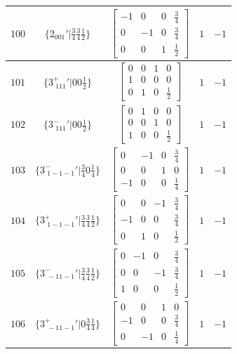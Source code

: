 \documentclass[fleqn,8pt]{jsarticle}
\begin{document}
\begin{longtable}{ccccc}
$ 100 $ & $ \{2{}_{001}{}'|\frac{3}{4} \frac{3}{4} \frac{1}{2}\} $ & $ \begin{bmatrix} -1 & 0 & 0 & \frac{3}{4} \\ 0 & -1 & 0 & \frac{3}{4} \\ 0 & 0 & 1 & \frac{1}{2} \end{bmatrix} $ & $ 1 $ & $ -1 $ \\ \hline
$ 101 $ & $ \{3^{+}_{\,\,111}{}'|0 0 \frac{1}{2}\} $ & $ \begin{bmatrix} 0 & 0 & 1 & 0 \\ 1 & 0 & 0 & 0 \\ 0 & 1 & 0 & \frac{1}{2} \end{bmatrix} $ & $ 1 $ & $ -1 $ \\ \hline
$ 102 $ & $ \{3^{-}_{\,\,111}{}'|0 0 \frac{1}{2}\} $ & $ \begin{bmatrix} 0 & 1 & 0 & 0 \\ 0 & 0 & 1 & 0 \\ 1 & 0 & 0 & \frac{1}{2} \end{bmatrix} $ & $ 1 $ & $ -1 $ \\ \hline
$ 103 $ & $ \{3^{-}_{\,\,1-1-1}{}'|\frac{3}{4} 0 \frac{1}{4}\} $ & $ \begin{bmatrix} 0 & -1 & 0 & \frac{3}{4} \\ 0 & 0 & 1 & 0 \\ -1 & 0 & 0 & \frac{1}{4} \end{bmatrix} $ & $ 1 $ & $ -1 $ \\ \hline
$ 104 $ & $ \{3^{+}_{\,\,1-1-1}{}'|\frac{3}{4} \frac{3}{4} \frac{1}{2}\} $ & $ \begin{bmatrix} 0 & 0 & -1 & \frac{3}{4} \\ -1 & 0 & 0 & \frac{3}{4} \\ 0 & 1 & 0 & \frac{1}{2} \end{bmatrix} $ & $ 1 $ & $ -1 $ \\ \hline
$ 105 $ & $ \{3^{-}_{\,\,-11-1}{}'|\frac{3}{4} \frac{3}{4} \frac{1}{2}\} $ & $ \begin{bmatrix} 0 & -1 & 0 & \frac{3}{4} \\ 0 & 0 & -1 & \frac{3}{4} \\ 1 & 0 & 0 & \frac{1}{2} \end{bmatrix} $ & $ 1 $ & $ -1 $ \\ \hline
$ 106 $ & $ \{3^{+}_{\,\,-11-1}{}'|0 \frac{3}{4} \frac{1}{4}\} $ & $ \begin{bmatrix} 0 & 0 & 1 & 0 \\ -1 & 0 & 0 & \frac{3}{4} \\ 0 & -1 & 0 & \frac{1}{4} \end{bmatrix} $ & $ 1 $ & $ -1 $ \\ \hline

\end{longtable}
\end{document}
